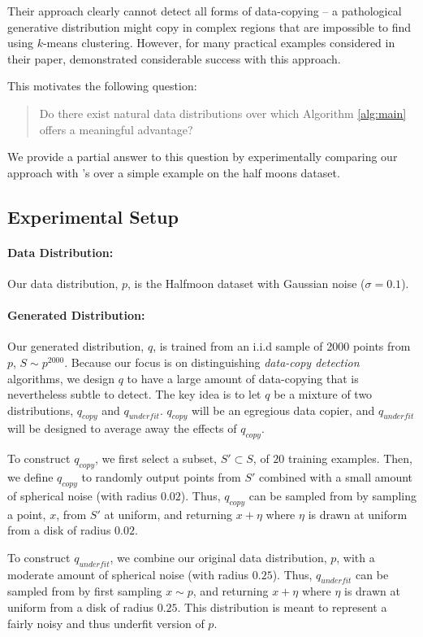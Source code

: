 Their approach clearly cannot detect all forms of data-copying -- a pathological generative distribution might copy in complex regions that are impossible to find using $k$-means clustering. However, for many practical examples considered in their paper, \cite{MCD2020} demonstrated considerable success with this approach. 

This motivates the following question: 
\begin{quote}
Do there exist natural data distributions over which Algorithm \ref{alg:main} offers a meaningful advantage?
\end{quote} 

We provide a partial answer to this question by experimentally comparing our approach with \cite{MCD2020}'s over a simple example on the half moons dataset.

\subsection{Experimental Setup}

\paragraph{Data Distribution:} Our data distribution, $p$, is the Halfmoon dataset with Gaussian noise ($\sigma = 0.1$).  

\paragraph{Generated Distribution:} Our generated distribution, $q$, is trained from an i.i.d sample of 2000 points from $p$, $S \sim p^{2000}$. Because our focus is on distinguishing \textit{data-copy detection} algorithms, we design $q$ to have a large amount of data-copying that is nevertheless subtle to detect. The key idea is to let $q$ be a mixture of two distributions, $q_{copy}$ and $q_{underfit}$. $q_{copy}$ will be an egregious data copier, and $q_{underfit}$ will be designed to average away the effects of $q_{copy}$. 

To construct $q_{copy}$, we first select a subset, $S' \subset S$, of $20$ training examples. Then, we define $q_{copy}$ to randomly output points from $S'$ combined with a small amount of spherical noise (with radius $0.02$). Thus, $q_{copy}$ can be sampled from by sampling a point, $x$, from $S'$ at uniform, and returning $x+\eta$ where $\eta$ is drawn at uniform from a disk of radius $0.02$.

To construct $q_{underfit}$, we combine our original data distribution, $p$, with a moderate amount of spherical noise (with radius $0.25$). Thus, $q_{underfit}$ can be sampled from by first sampling $x \sim p$, and returning $x+ \eta$ where $\eta$ is drawn at uniform from a disk of radius $0.25$. This distribution is meant to represent a fairly noisy and thus underfit version of $p$. 

